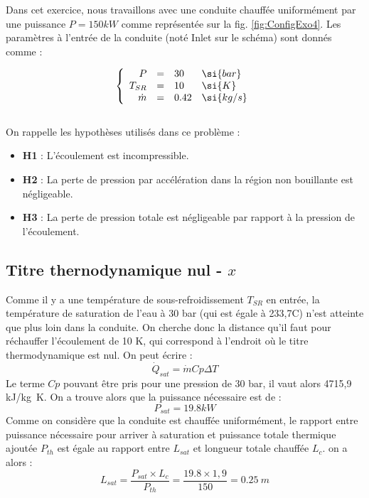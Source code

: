 Dans cet exercice, nous travaillons avec une conduite chauffée uniformément par une puissance $P = 150 \si{kW}$ comme représentée sur la fig. \ref{fig:ConfigExo4}. Les paramètres à l'entrée de la conduite (noté Inlet sur le schéma) sont donnés comme :

\begin{equation}
    \left\{
    \begin{array}{r c l l}
    P &=& 30 & \si{bar} \\
    T_{SR} &=& 10 & \si{K}\\
    \dot{m} &=& 0.42 &\si{kg/s}
    \end{array}
    \right.
\end{equation}
\\
On rappelle les hypothèses utilisés dans ce problème :
\begin{itemize}
    \item \textbf{H1} : L'écoulement est incompressible.
    \item \textbf{H2} : La perte de pression par accélération dans la région non bouillante est négligeable.
     \item \textbf{H3} : La perte de pression totale est négligeable par rapport à la pression de l'écoulement.
\end{itemize}
\vspace{12pt}
\par
\subsection{Titre thernodynamique nul - $x$}
Comme il y a une température de sous-refroidissement $T_{SR}$ en entrée, la température de saturation de l'eau à 30 \si{bar} (qui est égale à 233,7\degre C) n'est atteinte que plus loin dans la conduite. On cherche donc la distance qu'il faut pour réchauffer l'écoulement de 10 \si{K}, qui correspond à l'endroit où le titre thermodynamique est nul.
On peut écrire :
\begin{equation}
    \dot{Q}_{sat} = \dot{m} Cp \Delta T
\end{equation}
Le terme $Cp$ pouvant être pris pour une pression de 30 \si{bar}, il vaut alors 4715,9 \si{kJ/kg K}. On a trouve alors que la puissance nécessaire est de :
\begin{equation}
    P_{sat} = 19.8 \si{kW}
\end{equation}
Comme on considère que la conduite est chauffée uniformément, le rapport entre puissance nécessaire pour arriver à saturation et puissance totale thermique ajoutée $P_{th}$ est égale au rapport entre $L_{sat}$ et longueur totale chauffée $L_c$. on a alors :
\begin{equation}
\boxed{
    L_{sat}= \frac{ P_{sat}\times L_c}{P_{th}} = \frac{19.8 \times 1,9}{150} = 0.25~\si{m} 
    }
\end{equation}
